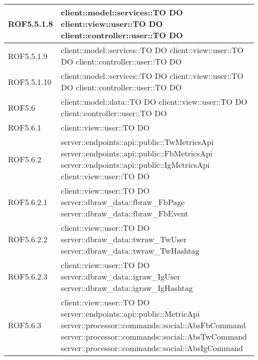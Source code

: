 \begin{center}
\begin{longtable}{| p{2.5cm} | p{11cm} |}
\hline
ROF5.5.1.8 & client::model::services::TO DO \newline client::view::user::TO DO \newline client::controller::user::TO DO \\
\hline
ROF5.5.1.9 & client::model::services::TO DO \newline client::view::user::TO DO \newline client::controller::user::TO DO \\
\hline
ROF5.5.1.10 & client::model::services::TO DO \newline client::view::user::TO DO \newline client::controller::user::TO DO \\
\hline
ROF5.6 & client::model::data::TO DO \newline client::view::user::TO DO \newline client::controller::user::TO DO \\
\hline
ROF5.6.1 & client::view::user::TO DO \\
\hline
ROF5.6.2 & server::endpoints::api::public::TwMetricsApi \newline server::endpoints::api::public::FbMetricsApi \newline server::endpoints::api::public::IgMetricsApi \newline client::view::user::TO DO \\
\hline
ROF5.6.2.1 & client::view::user::TO DO \newline server::dbraw\_data::fbraw\_FbPage \newline server::dbraw\_data::fbraw\_FbEvent \\
\hline
ROF5.6.2.2 & client::view::user::TO DO \newline server::dbraw\_data::twraw\_TwUser \newline server::dbraw\_data::twraw\_TwHashtag \\
\hline
ROF5.6.2.3 & client::view::user::TO DO \newline server::dbraw\_data::igraw\_IgUser \newline server::dbraw\_data::igraw\_IgHashtag \\
\hline
ROF5.6.3 & client::view::user::TO DO \newline server::endpoints::api::public::MetricApi \newline server::processor::commands::social::AbsFbCommand \newline server::processor::commands::social::AbsTwCommand \newline server::processor::commands::social::AbsIgCommand\\

\end{longtable}
\end{center}
